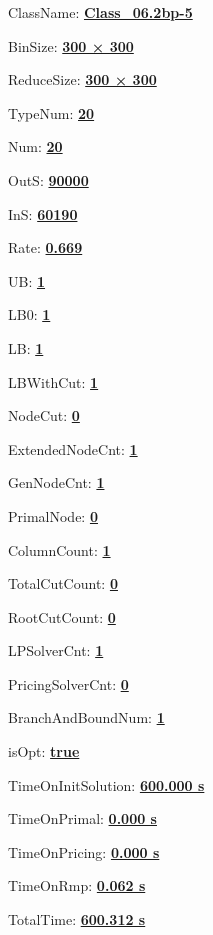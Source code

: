 \documentclass[11pt]{article}
\begin{document}
\pagestyle{empty}


ClassName: \underline{\textbf{Class_06.2bp-5}}
\par
BinSize: \underline{\textbf{300 × 300}}
\par
ReduceSize: \underline{\textbf{300 × 300}}
\par
TypeNum: \underline{\textbf{20}}
\par
Num: \underline{\textbf{20}}
\par
OutS: \underline{\textbf{90000}}
\par
InS: \underline{\textbf{60190}}
\par
Rate: \underline{\textbf{0.669}}
\par
UB: \underline{\textbf{1}}
\par
LB0: \underline{\textbf{1}}
\par
LB: \underline{\textbf{1}}
\par
LBWithCut: \underline{\textbf{1}}
\par
NodeCut: \underline{\textbf{0}}
\par
ExtendedNodeCnt: \underline{\textbf{1}}
\par
GenNodeCnt: \underline{\textbf{1}}
\par
PrimalNode: \underline{\textbf{0}}
\par
ColumnCount: \underline{\textbf{1}}
\par
TotalCutCount: \underline{\textbf{0}}
\par
RootCutCount: \underline{\textbf{0}}
\par
LPSolverCnt: \underline{\textbf{1}}
\par
PricingSolverCnt: \underline{\textbf{0}}
\par
BranchAndBoundNum: \underline{\textbf{1}}
\par
isOpt: \underline{\textbf{true}}
\par
TimeOnInitSolution: \underline{\textbf{600.000 s}}
\par
TimeOnPrimal: \underline{\textbf{0.000 s}}
\par
TimeOnPricing: \underline{\textbf{0.000 s}}
\par
TimeOnRmp: \underline{\textbf{0.062 s}}
\par
TotalTime: \underline{\textbf{600.312 s}}
\par
\newpage
\end{document}
